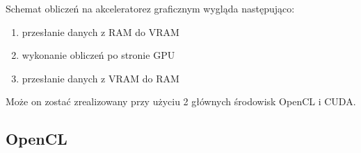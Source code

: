 Schemat obliczeń na akceleratorez graficznym wygląda następująco:
\begin{enumerate}
	\item przesłanie danych z RAM do VRAM
	\item wykonanie obliczeń po stronie GPU
	\item przesłanie danych z VRAM do RAM
\end{enumerate}

Może on zostać zrealizowany przy użyciu 2 głównych środowisk OpenCL i CUDA.

\subsection{OpenCL}


































 